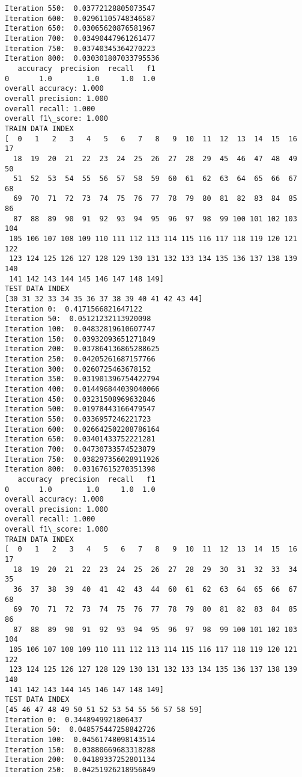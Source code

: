 \documentclass[11pt]{article}
\begin{document}
\begin{Verbatim}[commandchars=\\\{\}]
Iteration 550:  0.03772128805073547
Iteration 600:  0.02961105748346587
Iteration 650:  0.03065620876581967
Iteration 700:  0.03490447961261477
Iteration 750:  0.03740345364270223
Iteration 800:  0.030301807033795536
   accuracy  precision  recall   f1
0       1.0        1.0     1.0  1.0
overall accuracy: 1.000
overall precision: 1.000
overall recall: 1.000
overall f1\_score: 1.000
TRAIN DATA INDEX
[  0   1   2   3   4   5   6   7   8   9  10  11  12  13  14  15  16  17
  18  19  20  21  22  23  24  25  26  27  28  29  45  46  47  48  49  50
  51  52  53  54  55  56  57  58  59  60  61  62  63  64  65  66  67  68
  69  70  71  72  73  74  75  76  77  78  79  80  81  82  83  84  85  86
  87  88  89  90  91  92  93  94  95  96  97  98  99 100 101 102 103 104
 105 106 107 108 109 110 111 112 113 114 115 116 117 118 119 120 121 122
 123 124 125 126 127 128 129 130 131 132 133 134 135 136 137 138 139 140
 141 142 143 144 145 146 147 148 149]
TEST DATA INDEX
[30 31 32 33 34 35 36 37 38 39 40 41 42 43 44]
Iteration 0:  0.4171566821647122
Iteration 50:  0.05121232113920098
Iteration 100:  0.04832819610607747
Iteration 150:  0.03932093651271849
Iteration 200:  0.037864136865288625
Iteration 250:  0.04205261687157766
Iteration 300:  0.0260725463678152
Iteration 350:  0.031901396754422794
Iteration 400:  0.014496844039040066
Iteration 450:  0.03231508969632846
Iteration 500:  0.01978443166479547
Iteration 550:  0.0336957246221723
Iteration 600:  0.026642502208786164
Iteration 650:  0.03401433752221281
Iteration 700:  0.04730733574523879
Iteration 750:  0.038297356028911926
Iteration 800:  0.03167615270351398
   accuracy  precision  recall   f1
0       1.0        1.0     1.0  1.0
overall accuracy: 1.000
overall precision: 1.000
overall recall: 1.000
overall f1\_score: 1.000
TRAIN DATA INDEX
[  0   1   2   3   4   5   6   7   8   9  10  11  12  13  14  15  16  17
  18  19  20  21  22  23  24  25  26  27  28  29  30  31  32  33  34  35
  36  37  38  39  40  41  42  43  44  60  61  62  63  64  65  66  67  68
  69  70  71  72  73  74  75  76  77  78  79  80  81  82  83  84  85  86
  87  88  89  90  91  92  93  94  95  96  97  98  99 100 101 102 103 104
 105 106 107 108 109 110 111 112 113 114 115 116 117 118 119 120 121 122
 123 124 125 126 127 128 129 130 131 132 133 134 135 136 137 138 139 140
 141 142 143 144 145 146 147 148 149]
TEST DATA INDEX
[45 46 47 48 49 50 51 52 53 54 55 56 57 58 59]
Iteration 0:  0.3448949921806437
Iteration 50:  0.048575447258842726
Iteration 100:  0.04561748098143514
Iteration 150:  0.03880669683318288
Iteration 200:  0.04189337252801134
Iteration 250:  0.04251926218956849

\end{Verbatim}
\end{document}

